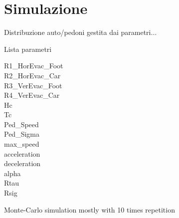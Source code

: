 \section{Simulazione}

Distribuzione auto/pedoni gestita dai parametri...

Lista parametri

\begin{description}
  \item[R1\_HorEvac\_Foot]
  \item[R2\_HorEvac\_Car]
  \item[R3\_VerEvac\_Foot]
  \item[R4\_VerEvac\_Car]
  \item[Hc]
  \item[Tc]
  \item[Ped\_Speed]
  \item[Ped\_Sigma]
  \item[max\_speed]
  \item[acceleration]
  \item[deceleration]
  \item[alpha]
  \item[Rtau]
  \item[Rsig]
\end{description}

Monte-Carlo simulation mostly with 10 times repetition
